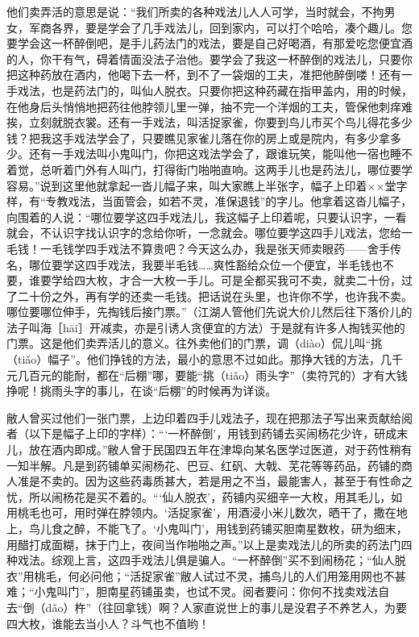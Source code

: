 \documentclass[12pt,UTF8]{ctexbook}
\begin{document}
他们卖弄活的意思是说：“我们所卖的各种戏法儿人人可学，当时就会，不拘男女，军商各界，要是学会了几手戏法儿，回到家内，可以打个哈哈，凑个趣儿。您要学会这一杯醉倒吧，是手儿药法门的戏法，要是自己好喝酒，有那爱吃您便宜酒的人，你干有气，碍着情面没法子治他。要学会了我这一杯醉倒的戏法儿，只要你把这种药放在酒内，他喝下去一杯，到不了一袋烟的工夫，准把他醉倒喽！还有一手戏法，也是药法门的，叫仙人脱衣。只要你把这种药藏在指甲盖内，用的时候，在他身后头悄悄地把药往他脖领儿里一弹，抽不完一个洋烟的工夫，管保他刺痒难挨，立刻就脱衣裳。还有一手戏法，叫活捉家雀，你要到鸟儿市买个鸟儿得花多少钱？把我这手戏法学会了，只要瞧见家雀儿落在你的房上或是院内，有多少拿多少。还有一手戏法叫小鬼叫门，你把这戏法学会了，跟谁玩笑，能叫他一宿也睡不着觉，总听着门外有人叫门，打得街门啪啪直响。这两手儿也是药法儿，哪位要学容易。”说到这里他就拿起一沓儿幅子来，叫大家瞧上半张字，幅子上印着××堂字样，有“专教戏法，当面管会，如若不灵，准保退钱”的字儿。他拿着这沓儿幅子，向围着的人说：“哪位要学这四手戏法儿，我这幅子上印着呢，只要认识字，一看就会，不认识字找认识字的念给你听，一念就会。哪位要学这四手儿戏法，您给一毛钱！一毛钱学四手戏法不算贵吧？今天这么办，我是张天师卖眼药——舍手传名，哪位要学这四手戏法，我要半毛钱……爽性豁给众位一个便宜，半毛钱也不要，谁要学给四大枚，才合一大枚一手儿。可是全都买我可不卖，就卖二十份，过了二十份之外，再有学的还卖一毛钱。把话说在头里，也许你不学，也许我不卖。哪位要哪位伸手，先掏钱后接门票。”（江湖人管他们先说大价儿然后往下落价儿的法子叫海［hāi］开减卖，亦是引诱人贪便宜的方法）于是就有许多人掏钱买他的门票。这是他们卖弄活儿的意义。往外卖他们的门票，调（diào）侃儿叫“挑（tiǎo）幅子”。他们挣钱的方法，最小的意思不过如此。那挣大钱的方法，几千元几百元的能耐，都在“后棚”哪，要能“挑（tiǎo）雨头字”（卖符咒的）才有大钱挣呢！挑雨头字的事儿，在谈“后棚”的时候再为详谈。

敝人曾买过他们一张门票，上边印着四手儿戏法子，现在把那法子写出来贡献给阅者（以下是幅子上印的字样）：“‘一杯醉倒’，用钱到药铺去买闹杨花少许，研成末儿，放在酒内即成。”敝人曾于民国四五年在津埠向某名医学过医道，对于药性稍有一知半解。凡是到药铺单买闹杨花、巴豆、红矾、大戟、芜花等等药品，药铺的商人准是不卖的。因为这些药毒质甚大，若是用之不当，最能害人，甚至于有性命之忧，所以闹杨花是买不着的。“‘仙人脱衣’，药铺内买细辛一大枚，用其毛儿，如用桃毛也可，用时弹在脖领内。‘活捉家雀’，用酒浸小米儿数次，晒干了，撒在地上，鸟儿食之醉，不能飞了。‘小鬼叫门’，用钱到药铺买胆南星数枚，研为细末，用醋打成面糊，抹于门上，夜间当作啪啪之声。”以上是卖戏法儿的所卖的药法门四种戏法。综观上言，这四手戏法儿俱是骗人。“一杯醉倒”买不到闹杨花；“仙人脱衣”用桃毛，何必问他；“活捉家雀”敝人试过不灵，捕鸟儿的人们用笼用网也不甚难；“小鬼叫门”，胆南星药铺虽卖，也试不灵。阅者要问：你何不找卖戏法自去“倒（dǎo）杵”（往回拿钱）啊？人家直说世上的事儿是没君子不养艺人，为要四大枚，谁能去当小人？斗气也不值哟！
\end{document}
